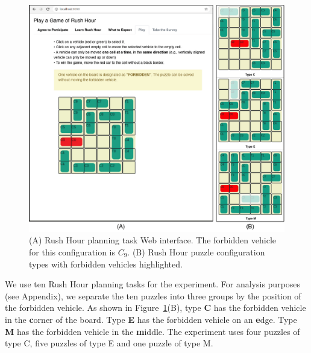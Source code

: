 \begin{figure}[tpb]
  \centering
\includegraphics[width=0.8\columnwidth]{img/figure6.jpg}
  \caption{(A) Rush Hour planning task Web interface. The forbidden vehicle for this configuration is $C_9$. (B) Rush Hour puzzle configuration types with forbidden vehicles highlighted.}
  \label{fig:ui}
\end{figure}

We use ten Rush Hour planning tasks for the experiment. 
For analysis purposes (see Appendix), we separate the ten puzzles into three groups by the position of the forbidden vehicle. 
As shown in Figure~\ref{fig:ui}(B), type \textbf{C} has the forbidden vehicle in the \textbf{c}orner of the board. 
Type \textbf{E} has the forbidden vehicle on an \textbf{e}dge. 
Type \textbf{M} has the forbidden vehicle in the \textbf{m}iddle. The experiment uses four puzzles of type C, five puzzles of type E and one puzzle of type M.


